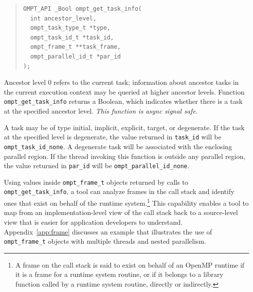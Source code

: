 \documentclass{article}
\begin{document}
\begin{quote}
\begin{verbatim}
OMPT_API _Bool ompt_get_task_info(
  int ancestor_level,
  ompt_task_type_t *type,
  ompt_task_id_t *task_id,
  ompt_frame_t **task_frame,
  ompt_parallel_id_t *par_id
);
\end{verbatim}
\end{quote}
\noindent
Ancestor level 0 refers to the current task; information about ancestor tasks in the current execution context may be queried at higher ancestor levels. 
Function \verb|ompt_get_task_info| returns a Boolean, which indicates whether there is a task at the specified ancestor level.
{\em This function is async signal safe.} 

A task may be of type initial, implicit, explicit,  target, or degenerate. If the task at the specified  level is degenerate, the value returned in \verb|task_id| will be \verb|ompt_task_id_none|. A degenerate task will be associated with the enclosing parallel region. If the thread invoking this function is outside any parallel region, the value returned in \verb|par_id| will be \verb|ompt_parallel_id_none|.

Using values inside  \verb|ompt_frame_t| objects returned by calls to  \verb|ompt_get_task_info|, a tool can analyze  frames in the call stack and identify ones that exist on behalf of the runtime system.\footnote{A frame on the call stack is said to exist on behalf of an OpenMP runtime if it is a frame for a runtime system routine, or if it belongs to a library function called by a runtime system routine, directly or indirectly.} 
This capability enables a tool to map from an implementation-level view of the call stack back to a source-level view that is easier for application developers to understand. 
Appendix~\ref{app:frame} discusses  an example that illustrates the use of \verb|ompt_frame_t| objects with multiple threads and nested parallelism.
\end{document}
